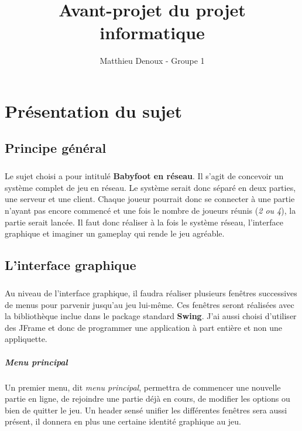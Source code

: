 \documentclass[a4paper,12pt]{report}
\title{Avant-projet du projet informatique}
\author{Matthieu Denoux - Groupe 1}
\begin{document}
\maketitle

\chapter{Présentation du sujet}

\section{Principe général}
\paragraph{}
Le sujet choisi a pour intitulé \textbf{Babyfoot en réseau}. Il s'agit de concevoir un système complet de jeu en réseau.
Le système serait donc séparé en deux parties, une serveur et une client. Chaque joueur pourrait donc se connecter à une partie
n'ayant pas encore commencé et une fois le nombre de joueurs réunis (\emph{2 ou 4}), la partie serait lancée. Il faut donc réaliser à la fois 
le système réseau, l'interface graphique et imaginer un gameplay qui rende le jeu agréable.

\section{L'interface graphique}
\paragraph{}
Au niveau de l'interface graphique, il faudra réaliser plusieurs fenêtres successives de menus pour parvenir jusqu'au jeu lui-même. Ces fenêtres seront réalisées avec la bibliothèque inclue dans le package standard \textbf{Swing}. J'ai aussi choisi d'utiliser des JFrame et donc de programmer une application à part entière et non une appliquette.
\paragraph{Menu principal}
Un premier menu, dit \emph{menu principal}, permettra de commencer une nouvelle partie en ligne, de rejoindre une partie
déjà en cours, de modifier les options ou bien de quitter le jeu. Un header sensé unifier les différentes fenêtres sera aussi présent, il donnera en plus une certaine identité graphique au jeu.
\end{document}
